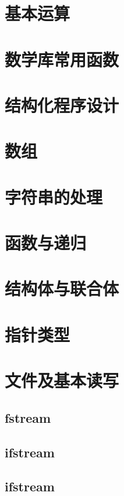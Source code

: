 \documentclass[12pt,twiside,a4paper]{ctexbook}
\numberwithin{chapter}{part}
\begin{document}
\chapter{基本运算}

\chapter{数学库常用函数}

\chapter{结构化程序设计}

\chapter{数组}

\chapter{字符串的处理}

\chapter{函数与递归}

\chapter{结构体与联合体}

\chapter{指针类型}

\chapter{文件及基本读写}
\section{fstream}
\section{ifstream}
\section{ifstream}
\end{document}
